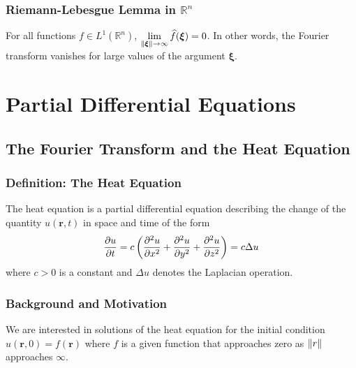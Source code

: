 \documentclass[11pt, a4paper]{article}
\newcommand{\R}{\mathbb{R}} %
\begin{document}
\subsubsection{Riemann-Lebesgue Lemma in $ \R^n $}
For all functions $ f \in L^1(\R^n) $, $ \displaystyle{\lim_{\norm{\bm{\xi}} \to \infty} \widehat{f}(\bm{\xi}) = 0} $. In other words, the Fourier transform vanishes for large values of the argument $ \bm{\xi} $.

\section{Partial Differential Equations}

\subsection{The Fourier Transform and the Heat Equation}

\subsubsection{Definition: The Heat Equation}
The heat equation is a partial differential equation describing the change of the quantity $ u(\bm{r}, t) $ in space and time of the form
\begin{equation*}
	\pdv{u}{t} = c \left(\pdv[2]{u}{x} + \pdv[2]{u}{y} + \pdv[2]{u}{z}\right) = c \Delta u
\end{equation*}
where $ c > 0 $ is a constant and $ \Delta u $ denotes the Laplacian operation.

\subsubsection{Background and Motivation}
We are interested in solutions of the heat equation for the initial condition $ u(\bm{r}, 0) = f(\bm{r}) $ where $ f $ is a given function that approaches zero as $ \norm{r} $ approaches $ \infty $. 
\end{document}

